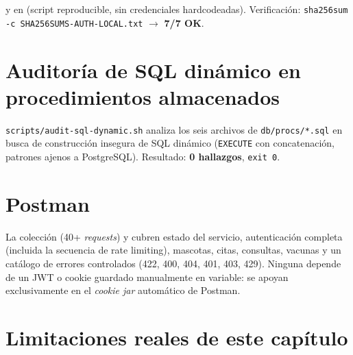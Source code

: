 y en  (script reproducible,
sin credenciales hardcodeadas). Verificaci\'on:
\texttt{sha256sum -c SHA256SUMS-AUTH-LOCAL.txt} $\to$ \textbf{7/7 OK}.

\section{Auditor\'ia de SQL din\'amico en procedimientos almacenados}

\texttt{scripts/audit-sql-dynamic.sh} analiza los seis archivos de
\texttt{db/procs/*.sql} en busca de construcci\'on insegura de SQL
din\'amico (\texttt{EXECUTE} con concatenaci\'on, patrones ajenos a
PostgreSQL). Resultado: \textbf{0 hallazgos}, \texttt{exit 0}.

\section{Postman}

La colecci\'on 
(40+ \emph{requests}) y 
cubren estado del servicio, autenticaci\'on completa (incluida la
secuencia de rate limiting), mascotas, citas, consultas, vacunas y un
cat\'alogo de errores controlados (422, 400, 404, 401, 403, 429). Ninguna
depende de un JWT o cookie guardado manualmente en variable: se apoyan
exclusivamente en el \emph{cookie jar} autom\'atico de Postman.

\section{Limitaciones reales de este cap\'itulo}

